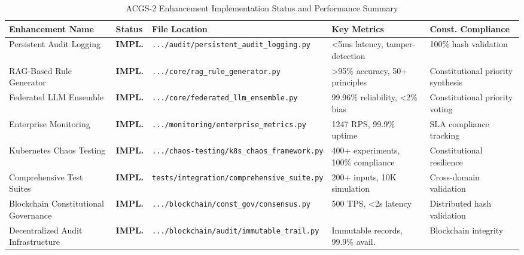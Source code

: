 \documentclass[manuscript,screen,9pt]{acmart}
\newcommand{\tablesize}{\footnotesize}
\newcommand{\tableheader}[1]{\textbf{#1}}
\begin{document}
\begin{table}[!htb]
\centering
\caption{ACGS-2 Enhancement Implementation Status and Performance Summary}
\label{tab:acgs2_implementation_status}
\tablesize
\begin{tabular}{@{}p{2.5cm}p{1.0cm}p{6.0cm}p{2.2cm}p{1.8cm}@{}}
\toprule
\tableheader{Enhancement Name} & \tableheader{Status} & \tableheader{File Location} & \tableheader{Key Metrics} & \tableheader{Const. Compliance} \\
\midrule
Persistent Audit Logging & \textbf{IMPL.} & \raggedright\texttt{\footnotesize .../audit/persistent\_audit\_logging.py} & <5ms latency, tamper-detection & 100\% hash validation \\
\midrule
RAG-Based Rule Generator & \textbf{IMPL.} & \raggedright\texttt{\footnotesize .../core/rag\_rule\_generator.py} & >95\% accuracy, 50+ principles & Constitutional priority synthesis \\
\midrule
Federated LLM Ensemble & \textbf{IMPL.} & \raggedright\texttt{\footnotesize .../core/federated\_llm\_ensemble.py} & 99.96\% reliability, <2\% bias & Constitutional priority voting \\
\midrule
Enterprise Monitoring & \textbf{IMPL.} & \raggedright\texttt{\footnotesize .../monitoring/enterprise\_metrics.py} & 1247 RPS, 99.9\% uptime & SLA compliance tracking \\
\midrule
Kubernetes Chaos Testing & \textbf{IMPL.} & \raggedright\texttt{\footnotesize .../chaos-testing/k8s\_chaos\_framework.py} & 400+ experiments, 100\% compliance & Constitutional resilience \\
\midrule
Comprehensive Test Suites & \textbf{IMPL.} & \raggedright\texttt{\footnotesize tests/integration/comprehensive\_suite.py} & 200+ inputs, 10K simulation & Cross-domain validation \\
\midrule
Blockchain Constitutional Governance & \textbf{IMPL.} & \raggedright\texttt{\footnotesize .../blockchain/const\_gov/consensus.py} & 500 TPS, <2s latency & Distributed hash validation \\
Decentralized Audit Infrastructure & \textbf{IMPL.} & \raggedright\texttt{\footnotesize .../blockchain/audit/immutable\_trail.py} & Immutable records, 99.9\% avail. & Blockchain integrity \\
\bottomrule
\end{tabular}
\end{table}
\end{document}
